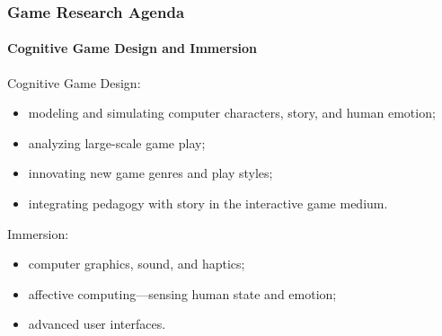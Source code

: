 \begin{frame}
\frametitle{Game Research Agenda}
\framesubtitle{Cognitive Game Design and Immersion}
\begin{block}{Cognitive Game Design:}
\begin{itemize}
\item
modeling and simulating computer characters,
story, and human emotion;
\item
analyzing large-scale game play;
\item
innovating new game genres and play styles;
\item
integrating pedagogy with story in the interactive game medium.
\end{itemize}
\end{block}

\pause

\begin{block}{Immersion:}
\begin{itemize}
\item
computer graphics, sound, and haptics;
\item
affective computing—sensing human state and
emotion;
\item
advanced user interfaces.
\end{itemize}
\end{block}
\end{frame}
